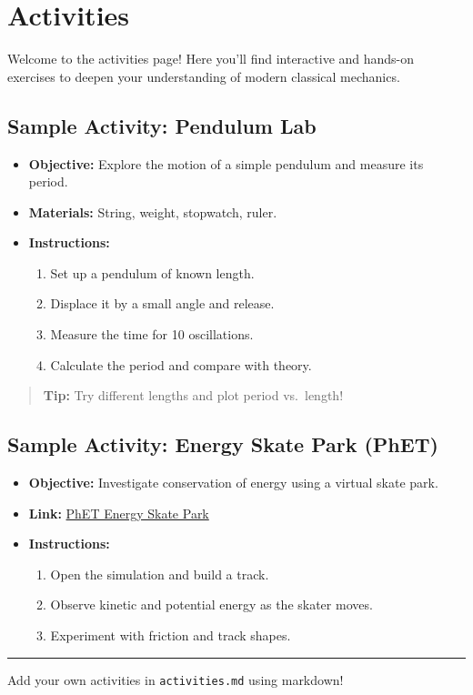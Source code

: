 \section{Activities}\label{activities}

Welcome to the activities page! Here you'll find interactive and
hands-on exercises to deepen your understanding of modern classical
mechanics.

\subsection{Sample Activity: Pendulum
Lab}\label{sample-activity-pendulum-lab}

\begin{itemize}
\tightlist
\item
  \textbf{Objective:} Explore the motion of a simple pendulum and
  measure its period.
\item
  \textbf{Materials:} String, weight, stopwatch, ruler.
\item
  \textbf{Instructions:}

  \begin{enumerate}
  \def\labelenumi{\arabic{enumi}.}
  \tightlist
  \item
    Set up a pendulum of known length.
  \item
    Displace it by a small angle and release.
  \item
    Measure the time for 10 oscillations.
  \item
    Calculate the period and compare with theory.
  \end{enumerate}
\end{itemize}

\begin{quote}
\textbf{Tip:} Try different lengths and plot period vs.~length!
\end{quote}

\subsection{Sample Activity: Energy Skate Park
(PhET)}\label{sample-activity-energy-skate-park-phet}

\begin{itemize}
\tightlist
\item
  \textbf{Objective:} Investigate conservation of energy using a virtual
  skate park.
\item
  \textbf{Link:}
  \href{https://phet.colorado.edu/en/simulation/energy-skate-park}{PhET
  Energy Skate Park}
\item
  \textbf{Instructions:}

  \begin{enumerate}
  \def\labelenumi{\arabic{enumi}.}
  \tightlist
  \item
    Open the simulation and build a track.
  \item
    Observe kinetic and potential energy as the skater moves.
  \item
    Experiment with friction and track shapes.
  \end{enumerate}
\end{itemize}

\begin{center}\rule{0.5\linewidth}{0.5pt}\end{center}

Add your own activities in \texttt{activities.md} using markdown!
